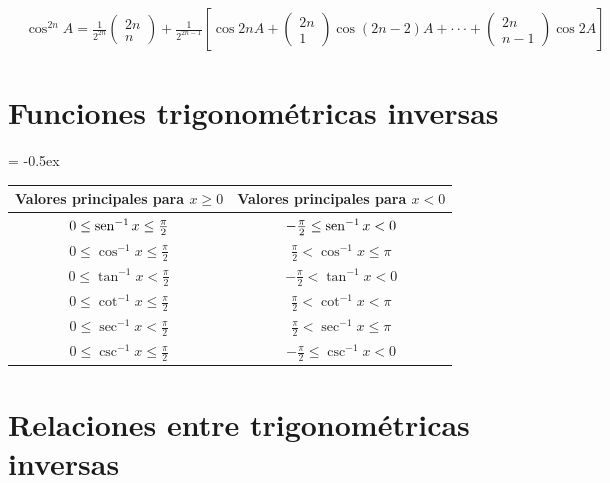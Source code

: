 \begin{align*}
&\cos^{2n} A = \frac{1}{2^{2n}}\begin{pmatrix}2n \\n\end{pmatrix}+\frac{1}{2^{2n-1}}\left[ \cos 2nA + \begin{pmatrix}2n \\1\end{pmatrix}\cos (2n-2)A + \cdot \cdot \cdot +\begin{pmatrix}2n \\n-1\end{pmatrix} \cos 2A \right]
\end{align*}

\clearpage

\section*{Funciones trigonométricas inversas}

\begin{table}[htb]
\extrarowheight = -0.5ex
\renewcommand{\arraystretch}{1.9}
\centering
\begin{tabular}{|c|c|}
\hline
Valores principales para $x \geq  0$ & Valores principales para $x<0$\\ \hline
$0\leq \operatorname{sen}^{-1} x  \leq \frac{\pi}{2}$ &  $-\frac{\pi}{2} \leq \operatorname{sen}^{-1} x < 0$\\ \hline
$0\leq \cos^{-1} x  \leq \frac{\pi}{2}$ &  $\frac{\pi}{2} < \cos^{-1} x \leq \pi$\\ \hline
$0\leq \tan^{-1} x  < \frac{\pi}{2}$ &  $-\frac{\pi}{2} < \tan^{-1} x < 0$\\ \hline
$0\leq \cot^{-1} x  \leq \frac{\pi}{2}$ &  $\frac{\pi}{2} < \cot^{-1} x < \pi$\\ \hline
$0\leq \sec^{-1} x  < \frac{\pi}{2}$ &  $\frac{\pi}{2} < \sec^{-1} x \leq \pi$\\ \hline
$0\leq \csc^{-1} x  \leq \frac{\pi}{2}$ &  $-\frac{\pi}{2} \leq \csc^{-1} x < 0$\\ \hline
\end{tabular}
\end{table}

\section*{Relaciones entre trigonométricas inversas}

